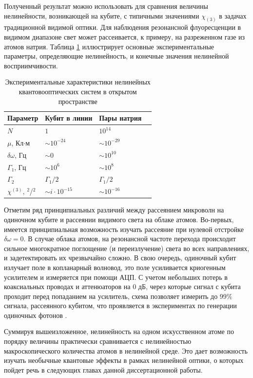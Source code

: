 Полученный результат можно использовать для сравнения величины нелинейности, возникающей на кубите, с типичными значениями $\chi_{(3)}$ в задачах традиционной видимой оптики. Для наблюдения резонансной флуоресценции в видимом диапазоне свет может рассеивается, к примеру, на разреженном газе из атомов натрия. Таблица \ref{Tab2} иллюстрирует основные экспериментальные параметры, определяющие нелинейность, и конечные значения нелинейной восприимчивости. 
\begin{table} [htbp]
	\centering
	\changecaptionwidth\captionwidth{15cm}
	\caption{Экспериментальные характеристики нелинейных квантовооптических систем в открытом пространстве}\label{Tab2}%
	\begin{tabular}{| p{2.4cm} | p{3.2cm} | p{3.2cm}l |}
		\hline
		\hline
		Параметр   & \centering Кубит в линии & \centering Пары натрия \cite{boyd2003nonlinear} & \\
		\hline
		$N$ &\centering  $1$  &\centering $10^{14}$ & \\
		$\mu$, Кл$\cdot$м &\centering  $\sim 10^{-24}$   &\centering  $\sim10^{-29}$ &\\
		$\delta\omega$, Гц &\centering  $\sim 0$  &\centering $\sim10^{10}$ &\\
		$\Gamma_1$, Гц &\centering  $\sim10^6$  &\centering $\sim10^8$ & \\
		$\Gamma_2$ &\centering  $\Gamma_1/2$  &\centering $\Gamma_1/2$ & \\
		$\chi^{(3)}$, \text{м}$^2$/\text{В}$^2$ &\centering $\sim i\cdot 10^{-15}$   &\centering  $\sim 10^{-16}$ & \\
		\hline
		\hline
	\end{tabular}
\end{table}

Отметим ряд принципиальных различий между рассеянием микроволн на одиночном кубите и рассеянии видимого света на облаке атомов. Во-первых, имеется принципиальная возможность изучать рассеяние при нулевой отстройке $\delta\omega\!=\!0$. В случае облака атомов, на резонансной частоте перехода происходит сильное многократное поглощение (и переизлучение) света во всех направлениях, и задетектировать их чрезвычайно сложно. В свою очередь, одиночный кубит излучает поле в копланарный волновод, это поле усиливается криогенным усилителем и измеряется при помощи АЦП. С учетом небольших потерь в коаксиальных проводах и аттенюаторов на 0 дБ, через которые сигнал с кубита проходит перед попаданием на усилитель, схема позволяет измерить до 99\% сигнала, рассеянного кубитом, что проявляется в экспериментах по генерации одиночных фотонов \cite{ZhouHighEfficiency}.

Суммируя вышеизложенное, нелинейность на одном искусственном атоме по порядку величины практически сравнивается с нелинейностью макроскопического количества атомов в нелинейной среде. Это дает возможность изучать необычные квантовые эффекты в рамках нелинейной оптики, о которых пойдет речь в следующих главах данной диссертационной работы. 



